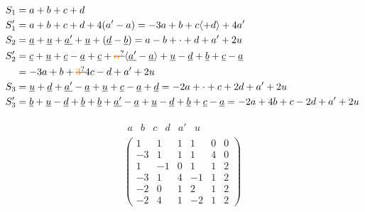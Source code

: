 \[
\begin{aligned}
S_1&=a+b+c+d\\
S'_1&=a+b+c+d+4(a'-a)=-3a+b+c\inserted{+d}+4a'\\
S_2&=\underline a+\underline u+\underline{a'}+\underline u+(\underline d-\underline b)=a-b+\cdot+d+a'+2u\\
S'_2&=\underline c+\underline u+\underline c-\underline a+\underline c+\deleted{\unsure{\alpha}}\inserted{\underline{a'}-\underline a}+\underline u-\underline d+\underline b+\underline c-\underline a\\
&=-3a+b+\deleted{\unsure{3}}4c-d+a'+2u\\
S_3&=\underline u+\underline d+\underline{a'}-\underline a+\underline u+\underline c-\underline a+\underline d=-2a+\cdot+c+2d+a'+2u\\
S'_3&=\underline b+\underline u-\underline d+\underline b+\underline b+\underline{a'}-\underline a+\underline u-\underline d+\underline b+\underline c-\underline a=-2a+4b+c-2d+a'+2u
\end{aligned}
\]

\[
\begin{array}{c}
\begin{array}{rrrrrr}a&b&c&d&a'&u\end{array}\\
\begin{pmatrix}1&1&1&1&0&0\\-3&1&1&1&4&0\\1&-1&0&1&1&2\\-3&1&4&-1&1&2\\-2&0&1&2&1&2\\-2&4&1&-2&1&2\end{pmatrix}
\end{array}
\]


